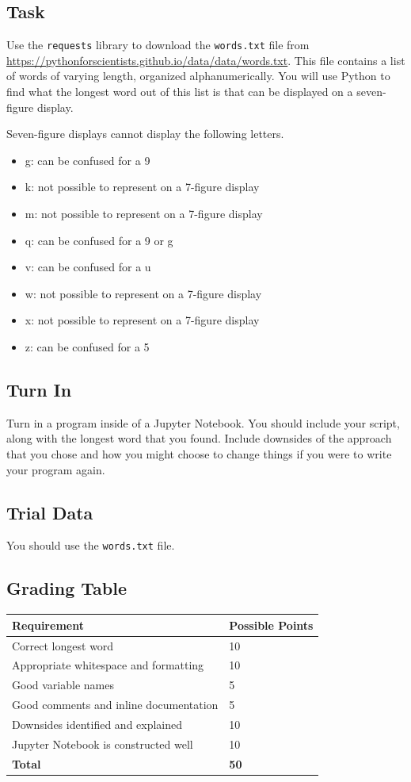 \subsection*{Task}
Use the \verb|requests| library to download the \verb|words.txt| file from \\\href{https://pythonforscientists.github.io/data/data/words.txt}{https://pythonforscientists.github.io/data/data/words.txt}. This file contains a list of words of varying length, organized alphanumerically. You will use Python to find what the longest word out of this list is that can be displayed on a seven-figure display.\par
Seven-figure displays cannot display the following letters.
\begin{itemize}
	\item g: can be confused for a 9
	\item k: not possible to represent on a 7-figure display
	\item m: not possible to represent on a 7-figure display
	\item q: can be confused for a 9 or g
	\item v: can be confused for a u
	\item w: not possible to represent on a 7-figure display
	\item x: not possible to represent on a 7-figure display
	\item z: can be confused for a 5
\end{itemize}
\subsection*{Turn In}
Turn in a program inside of a Jupyter Notebook. You should include your script, along with the longest word that you found. Include downsides of the approach that you chose and how you might choose to change things if you were to write your program again.
\subsection*{Trial Data}
You should use the \verb|words.txt| file.
\subsection*{Grading Table}
\begin{tabular}{|l|l|}
\hline
Requirement & Possible Points \\ \hline
Correct longest word & 10 \\ \hline
Appropriate whitespace and formatting & 10 \\ \hline
Good variable names & 5 \\ \hline
Good comments and inline documentation & 5 \\ \hline
Downsides identified and explained & 10 \\ \hline
Jupyter Notebook is constructed well & 10 \\ \hline
\hline
\textbf{Total} & \textbf{50} \\ \hline
\end{tabular}

